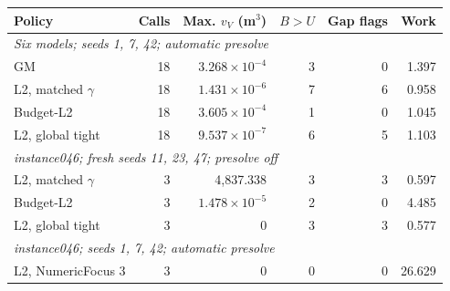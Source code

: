 \begin{tabular}{lrrrrr}
\toprule
Policy & Calls & Max. $v_V$ (m$^3$) & $B>U$ & Gap flags & Work\\
\midrule
\multicolumn{6}{l}{\emph{Six models; seeds 1, 7, 42; automatic presolve}}\\
GM & 18 & $3.268\times10^{-4}$ & 3 & 0 & 1.397\\
L2, matched $\gamma$ & 18 & $1.431\times10^{-6}$ & 7 & 6 & 0.958\\
Budget-L2 & 18 & $3.605\times10^{-4}$ & 1 & 0 & 1.045\\
L2, global tight & 18 & $9.537\times10^{-7}$ & 6 & 5 & 1.103\\
\midrule
\multicolumn{6}{l}{\emph{instance046; fresh seeds 11, 23, 47; presolve off}}\\
L2, matched $\gamma$ & 3 & 4,837.338 & 3 & 3 & 0.597\\
Budget-L2 & 3 & $1.478\times10^{-5}$ & 2 & 0 & 4.485\\
L2, global tight & 3 & 0 & 3 & 3 & 0.577\\
\midrule
\multicolumn{6}{l}{\emph{instance046; seeds 1, 7, 42; automatic presolve}}\\
L2, NumericFocus 3 & 3 & 0 & 0 & 0 & 26.629\\
\bottomrule
\end{tabular}
